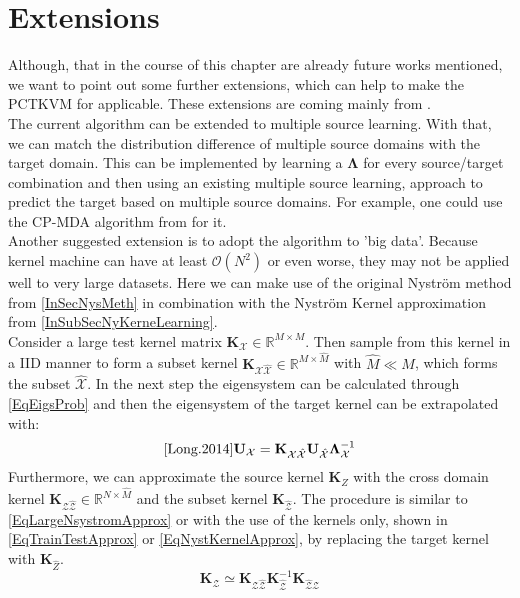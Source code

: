 \section{Extensions}\label{InSubSecFExt}
Although, that in the course of this chapter are already future works mentioned, we want to point out some further extensions, which can help to make the \acs{PCTKVM} for applicable.
These extensions are coming mainly from \cite{Long.2015}.\\
The current algorithm can be extended to multiple source learning.
With that, we can match the distribution difference of multiple source domains with the target domain.
This can be implemented by learning a $\mathbf{\Lambda}$ for every source/target combination and then using an existing multiple source learning, approach to predict the target based on multiple source domains.
For example, one could use the \ac{CP-MDA} algorithm from \cite{Chattopadhyay.2012} for it.\\
Another suggested extension is to adopt the algorithm to 'big data'.
Because kernel machine can have at least $\mathcal{O}(N^2)$ or even worse, they may not be applied well to very large datasets.
Here we can make use of the original Nyström method from \ref{InSecNysMeth} in combination with the Nyström Kernel approximation from \ref{InSubSecNyKerneLearning}.\cite{Long.2015}\\
Consider a large test kernel matrix $\mathbf{K}_\mathcal{X} \in \mathbb{R}^{M\times M}$.
Then sample from this kernel in a \acs{IID} manner to form a subset kernel $\mathbf{K}_\mathcal{X\hat{X}} \in \mathbb{R}^{M\times \hat{M}}$ with $\hat{M} \ll M$, which forms the subset $\mathcal{\hat{X}}$.
In the next step the eigensystem can be calculated through \eqref{EqEigsProb} and then the eigensystem of the target kernel can be extrapolated with:
\begin{equation}\label{EqLargeNsystromApprox}\cite{Long.2014}
\mathbf{U}_\mathcal{X}=\mathbf{K}_\mathcal{X\hat{X}}\mathbf{U}_\mathcal{\hat{X}}\mathbf{\Lambda}_\mathcal{X}^{-1}
\end{equation}
Furthermore, we can approximate the source kernel $\mathbf{K}_{Z}$ with the  cross domain kernel $\mathbf{K}_{\mathcal{Z\hat{Z}}} \in \mathbb{R}^{N\times \hat{M}}$ and the subset kernel $\mathbf{K}_\mathcal{\hat{Z}}$.
The procedure is similar to \eqref{EqLargeNsystromApprox} or with the use of the kernels only, shown in \eqref{EqTrainTestApprox} or \eqref{EqNystKernelApprox}, by replacing the target kernel with $\mathbf{K}_{\hat{Z}}$.
\begin{equation}
\mathbf{K}_\mathcal{Z} \simeq	\mathbf{K}_{\mathcal{Z\hat{Z}}}\mathbf{K}_\mathcal{\hat{Z}}^{-1}\mathbf{K}_{\mathcal{\hat{Z}Z}}
\end{equation}
